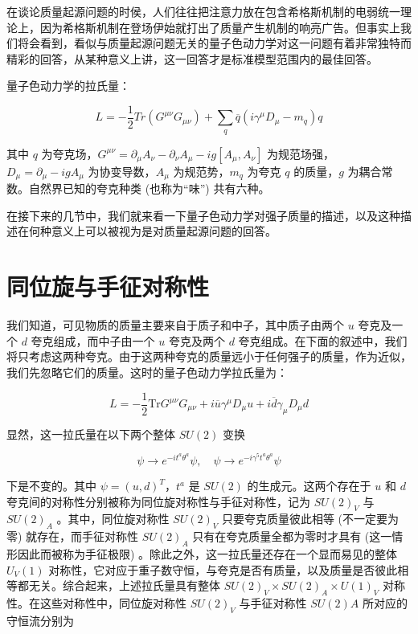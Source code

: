 \documentclass[oneside,a4paper,openany,11pt]{ctexbook}
\begin{document}
在谈论质量起源问题的时侯，人们往往把注意力放在包含希格斯机制的电弱统一理论上，因为希格斯机制在登场伊始就打出了质量产生机制的响亮广告。但事实上我们将会看到，看似与质量起源问题无关的量子色动力学对这一问题有着非常独特而精彩的回答，从某种意义上讲，这一回答才是标准模型范围内的最佳回答。

量子色动力学的拉氏量：

\begin{equation}
    L = -\frac{1}{2} Tr(G^{\mu\nu} G_{\mu\nu}) + \sum_q \overline{q}(i\gamma^\mu D_\mu - m_q)q
\end{equation}

\noindent 其中 $q$ 为夸克场，$G^{\mu\nu}=\partial_\mu A_\nu - \partial_\nu A_\mu - i g [A_\mu, A_\nu]$ 为规范场强，$D_\mu=\partial_\mu-i g A_\mu$ 为协变导数，$A_\mu$ 为规范势，$m_q$ 为夸克 $q$ 的质量，$g$ 为耦合常数。自然界已知的夸克种类 (也称为“味”) 共有六种。

在接下来的几节中，我们就来看一下量子色动力学对强子质量的描述，以及这种描述在何种意义上可以被视为是对质量起源问题的回答。

\section{同位旋与手征对称性}

我们知道，可见物质的质量主要来自于质子和中子，其中质子由两个 $u$ 夸克及一个 $d$ 夸克组成，而中子由一个 $u$ 夸克及两个 $d$ 夸克组成。在下面的叙述中，我们将只考虑这两种夸克。由于这两种夸克的质量远小于任何强子的质量，作为近似，我们先忽略它们的质量。这时的量子色动力学拉氏量为：

\begin{equation}
    L = -\frac{1}{2} \mathrm{Tr} G^{\mu\nu} G_{\mu\nu} + i \overline{u} \gamma^\mu D_\mu u + i \overline{d} \gamma_\mu D_\mu d
\end{equation}

\noindent 显然，这一拉氏量在以下两个整体 $SU(2)$ 变换

\begin{equation}
    \psi \to e^{-i t^a \theta^a} \psi, \quad \psi \to e^{-i \gamma^5 t^a \theta^a} \psi
\end{equation}

\noindent 下是不变的。其中 $\psi=(u, d)^T$，$t^a$ 是 $SU(2)$ 的生成元。这两个存在于 $u$ 和 $d$ 夸克间的对称性分别被称为同位旋对称性与手征对称性，记为 $SU(2)_V$ 与 $SU(2)_A$ 。其中，同位旋对称性 $SU(2)_V$ 只要夸克质量彼此相等 (不一定要为零) 就存在，而手征对称性 $SU(2)_A$ 只有在夸克质量全都为零时才具有 (这一情形因此而被称为手征极限) 。除此之外，这一拉氏量还存在一个显而易见的整体 $U_V(1)$ 对称性，它对应于重子数守恒，与夸克是否有质量，以及质量是否彼此相等都无关。综合起来，上述拉氏量具有整体 $SU(2)_V \times SU(2)_A \times U(1)_V$ 对称性。在这些对称性中，同位旋对称性 $SU(2)_V$ 与手征对称性 $SU(2)A$ 所对应的守恒流分别为
\end{document}
